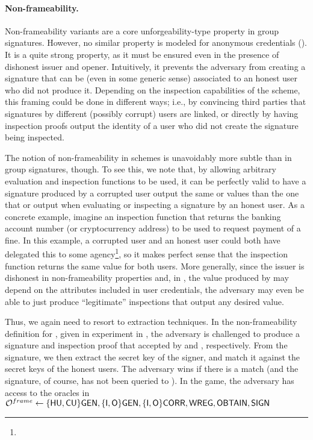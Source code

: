 \paragraph{Non-frameability.} %
Non-frameability variants are a core unforgeability-type property in group
signatures. However, no similar property is modeled for anonymous credentials
(). It is a quite
strong property, as it must be ensured even in the presence of dishonest issuer
and opener. Intuitively, it prevents the adversary from creating a signature
that can be (even in some generic sense) associated to an honest user who did
not produce it. Depending on the inspection capabilities of the scheme,
this framing could be done in different ways; i.e., by convincing third parties
that signatures by different (possibly corrupt) users are linked, or directly
by having inspection proofs output the identity of a user who did not create the
signature being inspected.

The notion of non-frameability in \UAS schemes is unavoidably more subtle than
in group signatures, though. To see this, we note that, by allowing arbitrary
evaluation and inspection functions to be used, it can be perfectly valid to
have a signature produced by a corrupted user output the same \yeval or \yinsp
values than the one that \feval or \finsp output when evaluating or inspecting
a signature by an honest user. As a concrete example, imagine an inspection
function that returns the banking account number (or cryptocurrency address) to
be used to request payment of a fine. In this example, a corrupted user and an
honest user could both have delegated this to some agency\footnote{}, so
it makes perfect sense that the inspection function returns the same value for
both users.
%
More generally, since the issuer is dishonest in non-frameability properties
and, in \UAS, the value produced by \Inspect may depend on the attributes
included in user credentials, the adversary may even be able to just produce
``legitimate'' inspections that output any desired value.

Thus, we again need to resort to extraction techniques. In the non-frameability
definition for \UAS, given in experiment \ExpNonframe in
, the adversary is challenged to produce a signature
and inspection proof that accepted by \Verify and \Judge, respectively. From
the signature, we then extract the secret key of the signer, and match it
against the secret keys of the honest users. The adversary wins if there is a
match (and the signature, of course, has not been queried to \SIGN). In the
game, the adversary has access to the oracles in 
$\mathcal{O}^{frame} \gets \lbrace\mathsf{HU},\mathsf{CU}\rbrace\mathsf{GEN},
\lbrace\mathsf{I},\mathsf{O}\rbrace\mathsf{GEN},\lbrace\mathsf{I},\mathsf{O}\rbrace\mathsf{CORR},\mathsf{WREG},\mathsf{OBTAIN},\mathsf{SIGN}$


